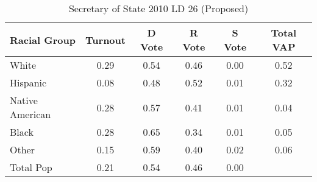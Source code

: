 \begin{table}[htb]
\begin{center}
\caption{Secretary of State 2010 LD 26 (Proposed)}
\label{sos10_vap_ld_26}
\begin{tabular}{lccccc}
  \hline
Racial Group & Turnout & D Vote & R Vote & S Vote & Total VAP \\ 
  \hline
White & 0.29 & 0.54 & 0.46 & 0.00 & 0.52 \\ 
  Hispanic & 0.08 & 0.48 & 0.52 & 0.01 & 0.32 \\ 
  Native American & 0.28 & 0.57 & 0.41 & 0.01 & 0.04 \\ 
  Black & 0.28 & 0.65 & 0.34 & 0.01 & 0.05 \\ 
  Other & 0.15 & 0.59 & 0.40 & 0.02 & 0.06 \\ 
  Total Pop & 0.21 & 0.54 & 0.46 & 0.00 &  \\ 
   \hline
\end{tabular}
\end{center}
\end{table}
